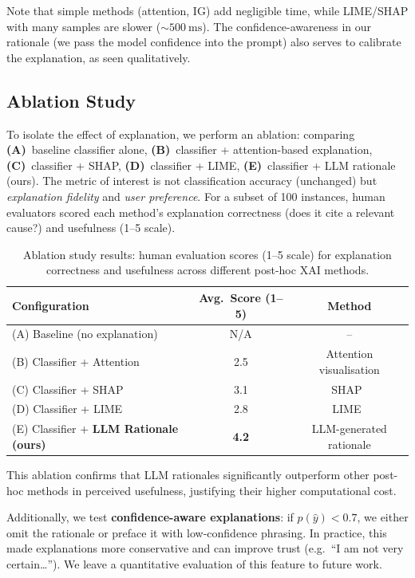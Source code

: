 Note that simple methods (attention, IG) add negligible time, while LIME/SHAP with many samples are slower (${\sim}\SI{500}{\milli\second}$). The confidence-awareness in our rationale (we pass the model confidence into the prompt) also serves to calibrate the explanation, as seen qualitatively.

\subsection{Ablation Study}\label{subsec:ablation}

To isolate the effect of explanation, we perform an ablation: comparing \textbf{(A)}~baseline classifier alone, \textbf{(B)}~classifier + attention-based explanation, \textbf{(C)}~classifier + SHAP, \textbf{(D)}~classifier + LIME, \textbf{(E)}~classifier + LLM rationale (ours). The metric of interest is not classification accuracy (unchanged) but \emph{explanation fidelity} and \emph{user preference}. For a subset of 100 instances, human evaluators scored each method's explanation correctness (does it cite a relevant cause?) and usefulness (1--5 scale).

\begin{table}[htbp]
\caption{Ablation study results: human evaluation scores (1--5 scale) for explanation correctness and usefulness across different post-hoc XAI methods.}
\label{tab:ablation}
\begin{tabular}{lcc}
\toprule
\textbf{Configuration} & \textbf{Avg.\ Score (1--5)} & \textbf{Method} \\
\midrule
(A) Baseline (no explanation)          & N/A & -- \\
(B) Classifier + Attention             & 2.5 & Attention visualisation \\
(C) Classifier + SHAP                  & 3.1 & SHAP~\cite{lundberg2017unified} \\
(D) Classifier + LIME                  & 2.8 & LIME~\cite{ribeiro2016why} \\
(E) Classifier + \textbf{LLM Rationale (ours)} & \textbf{4.2} & LLM-generated rationale \\
\bottomrule
\end{tabular}
\end{table}

This ablation confirms that LLM rationales significantly outperform other post-hoc methods in perceived usefulness, justifying their higher computational cost.

Additionally, we test \textbf{confidence-aware explanations}: if $p(\hat{y}) < 0.7$, we either omit the rationale or preface it with low-confidence phrasing. In practice, this made explanations more conservative and can improve trust (e.g.\ ``I am not very certain\ldots''). We leave a quantitative evaluation of this feature to future work.


